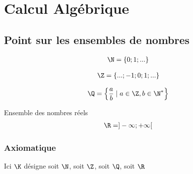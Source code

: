 \chapter{Calcul Algébrique}
\section{Point sur les ensembles de nombres}


\begin{graybox}
\begin{definition}
	\begin{align*}
        \N = \{0; 1; ...\}
    \end{align*}
\end{definition}
\end{graybox}

\begin{graybox}
\begin{definition}
	\begin{align*}
        \Z = \{...; -1; 0; 1; ...\}
    \end{align*}
\end{definition}
\end{graybox}

\begin{graybox}
\begin{definition}
	\begin{align*}
        \Q = \left\{\frac{a}{b} \mid a \in \Z, b \in \N^* \right\}
	\end{align*}
\end{definition}
\end{graybox}

\begin{graybox}
\begin{definition}{Ensemble des nombres réels}
	\begin{align*}
        \R = ]-\infty; +\infty[	
	\end{align*}
\end{definition}
\end{graybox}

\subsection{Axiomatique}
Ici $\K$ désigne soit $\N$, soit $\Z$, soit $\Q$, soit $\R$


